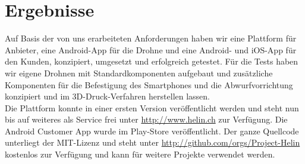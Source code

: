 \section*{Ergebnisse }
Auf Basis der von uns erarbeiteten Anforderungen haben wir eine Plattform für Anbieter, eine Android-App für die Drohne und eine Android- und iOS-App für den Kunden, konzipiert, umgesetzt und erfolgreich getestet. Für die Tests haben wir eigene Drohnen mit Standardkomponenten aufgebaut und zusätzliche Komponenten für die Befestigung des Smartphones und die Abwurfvorrichtung konzipiert und im 3D-Druck-Verfahren herstellen lassen. 
\\
Die Plattform konnte in einer ersten Version veröffentlicht werden und steht nun bis auf weiteres als Service frei unter \url{http://www.helin.ch} zur Verfügung. Die Android Customer App wurde im Play-Store veröffentlicht. Der ganze Quellcode unterliegt der MIT-Lizenz und steht unter \url{http://github.com/orgs/Project-Helin} kostenlos zur Verfügung und kann für weitere Projekte verwendet werden.